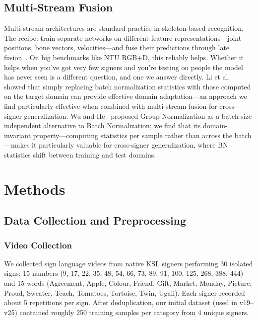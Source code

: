 \documentclass[conference]{IEEEtran}
\begin{document}
\subsection{Multi-Stream Fusion}

Multi-stream architectures are standard practice in skeleton-based recognition. The recipe: train separate networks on different feature representations---joint positions, bone vectors, velocities---and fuse their predictions through late fusion~\cite{shi2019twostreamAGCN}. On big benchmarks like NTU RGB+D, this reliably helps. Whether it helps when you've got very few signers and you're testing on people the model has never seen is a different question, and one we answer directly. Li et al.~\cite{li2017adabn} showed that simply replacing batch normalization statistics with those computed on the target domain can provide effective domain adaptation---an approach we find particularly effective when combined with multi-stream fusion for cross-signer generalization. Wu and He~\cite{wu2018groupnorm} proposed Group Normalization as a batch-size-independent alternative to Batch Normalization; we find that its domain-invariant property---computing statistics per sample rather than across the batch---makes it particularly valuable for cross-signer generalization, where BN statistics shift between training and test domains.

\section{Methods}

\subsection{Data Collection and Preprocessing}

\subsubsection{Video Collection}
We collected sign language videos from native KSL signers performing 30 isolated signs: 15 numbers (9, 17, 22, 35, 48, 54, 66, 73, 89, 91, 100, 125, 268, 388, 444) and 15 words (Agreement, Apple, Colour, Friend, Gift, Market, Monday, Picture, Proud, Sweater, Teach, Tomatoes, Tortoise, Twin, Ugali). Each signer recorded about 5 repetitions per sign. After deduplication, our initial dataset (used in v19--v25) contained roughly 250 training samples per category from 4 unique signers.
\end{document}
